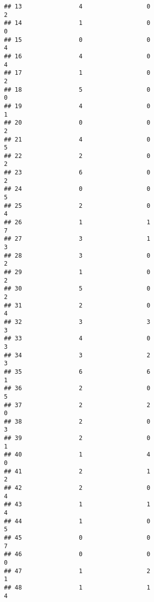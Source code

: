 \documentclass[
]{article}
\begin{document}
\begin{verbatim}
## 13                4                  0                              2
## 14                1                  0                              0
## 15                0                  0                              4
## 16                4                  0                              4
## 17                1                  0                              2
## 18                5                  0                              0
## 19                4                  0                              1
## 20                0                  0                              2
## 21                4                  0                              5
## 22                2                  0                              2
## 23                6                  0                              2
## 24                0                  0                              5
## 25                2                  0                              4
## 26                1                  1                              7
## 27                3                  1                              3
## 28                3                  0                              2
## 29                1                  0                              2
## 30                5                  0                              2
## 31                2                  0                              4
## 32                3                  3                              3
## 33                4                  0                              3
## 34                3                  2                              3
## 35                6                  6                              1
## 36                2                  0                              5
## 37                2                  2                              0
## 38                2                  0                              3
## 39                2                  0                              1
## 40                1                  4                              0
## 41                2                  1                              2
## 42                2                  0                              4
## 43                1                  1                              4
## 44                1                  0                              5
## 45                0                  0                              7
## 46                0                  0                              0
## 47                1                  2                              1
## 48                1                  1                              4

\end{verbatim}
\end{document}
